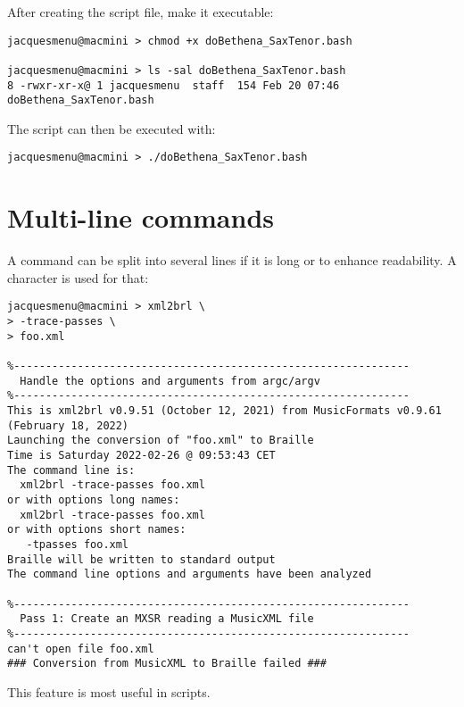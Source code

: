 After creating the script file, make it executable:
\begin{lstlisting}[language=Terminal]
jacquesmenu@macmini > chmod +x doBethena_SaxTenor.bash

jacquesmenu@macmini > ls -sal doBethena_SaxTenor.bash 
8 -rwxr-xr-x@ 1 jacquesmenu  staff  154 Feb 20 07:46 doBethena_SaxTenor.bash
\end{lstlisting}

The script can then be executed with:
\begin{lstlisting}[language=Terminal]
jacquesmenu@macmini > ./doBethena_SaxTenor.bash 
\end{lstlisting}


\section{Multi-line commands}\label{Multi-line commands}

A command can be split into several lines if it is long or to enhance readability. A \code{\textbackslash} character is used for that:
\begin{lstlisting}[language=Terminal]
jacquesmenu@macmini > xml2brl \
> -trace-passes \
> foo.xml

%--------------------------------------------------------------
  Handle the options and arguments from argc/argv
%--------------------------------------------------------------
This is xml2brl v0.9.51 (October 12, 2021) from MusicFormats v0.9.61 (February 18, 2022)
Launching the conversion of "foo.xml" to Braille
Time is Saturday 2022-02-26 @ 09:53:43 CET
The command line is:
  xml2brl -trace-passes foo.xml
or with options long names:
  xml2brl -trace-passes foo.xml
or with options short names:
   -tpasses foo.xml
Braille will be written to standard output
The command line options and arguments have been analyzed

%--------------------------------------------------------------
  Pass 1: Create an MXSR reading a MusicXML file
%--------------------------------------------------------------
can't open file foo.xml
### Conversion from MusicXML to Braille failed ###
\end{lstlisting}

This feature is most useful in scripts.


